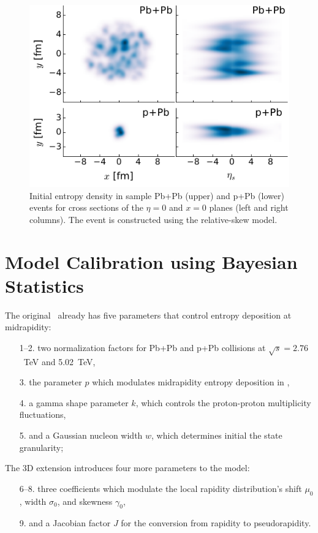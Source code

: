 \documentclass[3p,times,twocolumn]{elsarticle}
\begin{document}
\begin{figure}
\includegraphics[width=\columnwidth]{trento3d_example.pdf}
\caption{\label{fig:trento} Initial entropy density in sample Pb+Pb (upper) and p+Pb (lower) events for cross sections of the $\eta=0$ and $x=0$ planes (left and right columns). The event is constructed using the relative-skew model.}
\end{figure}

\section{Model Calibration using Bayesian Statistics}
The original \trento~already has five parameters that control entropy deposition at midrapidity:
\begin{enumerate}
  \item[1--2.] two normalization factors for Pb+Pb and p+Pb collisions at $\sqrt{s}=2.76$~TeV and 5.02~TeV,
  \item[3.] the parameter $p$ which modulates midrapidity entropy deposition in \trento,
  \item[4.] a gamma shape parameter $k$, which controls the proton-proton multiplicity fluctuations,
  \item[5.] and a Gaussian nucleon width $w$, which determines initial the state granularity;
\end{enumerate}
The 3D extension introduces four more parameters to the model:
\begin{enumerate}
  \setcounter{enumi}{6}
  \item[6--8.] three coefficients which modulate the local rapidity distribution's shift $\mu_0$, width $\sigma_0$, and skewness $\gamma_0$,
  \item[9.] and a Jacobian factor $J$ for the conversion from rapidity to pseudorapidity.
\end{enumerate}
\end{document}
